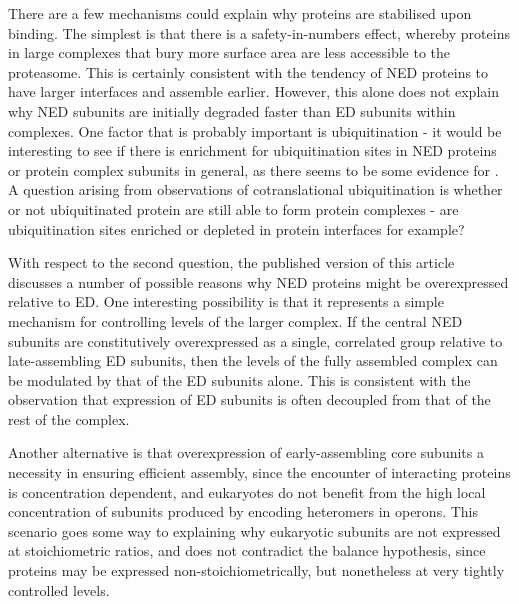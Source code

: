 \documentclass[a4paper,11pt,twoside,openright]{scrbook}
\begin{document}
There are a few mechanisms could explain why proteins are stabilised upon binding. The simplest is that there is a safety-in-numbers effect, whereby proteins in large complexes that bury more surface area are less accessible to the proteasome. This is certainly consistent with the tendency of NED proteins to have larger interfaces and assemble earlier. However, this alone does not explain why NED subunits are initially degraded faster than ED subunits within complexes. One factor that is probably important is ubiquitination - it would be interesting to see if there is enrichment for ubiquitination sites in NED proteins or protein complex subunits in general, as there seems to be some evidence for \cite{Chen2014}. A question arising from observations of cotranslational ubiquitination is whether or not ubiquitinated protein are still able to form protein complexes - are ubiquitination sites enriched or depleted in protein interfaces for example?

With respect to the second question, the published version of this article discusses a number of possible reasons why NED proteins might be overexpressed relative to ED. One interesting possibility is that it represents a simple mechanism for controlling levels of the larger complex. If the central NED subunits are constitutively overexpressed as a single, correlated group relative to late-assembling ED subunits, then the levels of the fully assembled complex can be modulated by that of the ED subunits alone. This is consistent with the observation that expression of ED subunits is often decoupled from that of the rest of the complex.

Another alternative is that overexpression of early-assembling core subunits a necessity in ensuring efficient assembly, since the encounter of interacting proteins is concentration dependent, and eukaryotes do not benefit from the high local concentration of subunits produced by encoding heteromers in operons. This scenario goes some way to explaining why eukaryotic subunits are not expressed at stoichiometric ratios, and does not contradict the balance hypothesis, since proteins may be expressed non-stoichiometrically, but nonetheless at very tightly controlled levels.


\end{document}
